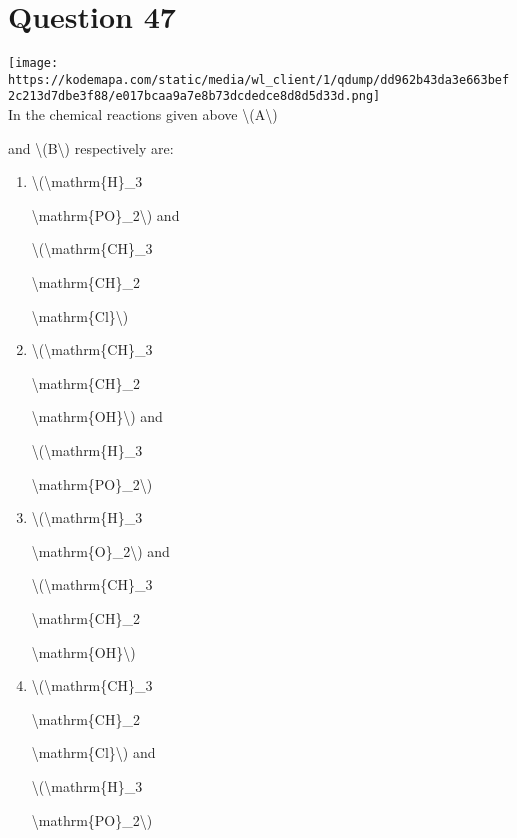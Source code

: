 \documentclass{article}
\begin{document}
\begin{enumerate}[label=(\alph*)]
\end{enumerate}
\newpage
\section*{Question 47}
\texttt{[image: https://kodemapa.com/static/media/wl\_client/1/qdump/dd962b43da3e663bef2c213d7dbe3f88/e017bcaa9a7e8b73dcdedce8d8d5d33d.png]}\\



In the chemical reactions given above \textbackslash(A\textbackslash)

and \textbackslash(B\textbackslash) respectively are:


\begin{enumerate}[label=(\alph*)]
\item \textbackslash(\textbackslash mathrm\{H\}\_3

\textbackslash mathrm\{PO\}\_2\textbackslash) and

\textbackslash(\textbackslash mathrm\{CH\}\_3

\textbackslash mathrm\{CH\}\_2

\textbackslash mathrm\{Cl\}\textbackslash)


\item \textbackslash(\textbackslash mathrm\{CH\}\_3

\textbackslash mathrm\{CH\}\_2

\textbackslash mathrm\{OH\}\textbackslash) and

\textbackslash(\textbackslash mathrm\{H\}\_3

\textbackslash mathrm\{PO\}\_2\textbackslash)


\item \textbackslash(\textbackslash mathrm\{H\}\_3

\textbackslash mathrm\{O\}\_2\textbackslash) and

\textbackslash(\textbackslash mathrm\{CH\}\_3

\textbackslash mathrm\{CH\}\_2

\textbackslash mathrm\{OH\}\textbackslash)


\item \textbackslash(\textbackslash mathrm\{CH\}\_3

\textbackslash mathrm\{CH\}\_2

\textbackslash mathrm\{Cl\}\textbackslash) and

\textbackslash(\textbackslash mathrm\{H\}\_3

\textbackslash mathrm\{PO\}\_2\textbackslash)


\end{enumerate}
\newpage
\end{document}
